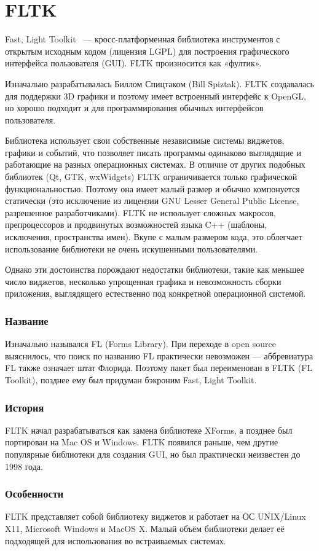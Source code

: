 \section{FLTK} %
Fast, Light Toolkit~\cite{wikiFL} — кросс-платформенная библиотека инструментов с открытым исходным кодом (лицензия LGPL) для построения графического интерфейса пользователя (GUI). FLTK произносится как «фултик».

Изначально разрабатывалась Биллом Спицтаком (Bill Spiztak). FLTK создавалась для поддержки 3D графики и поэтому имеет встроенный интерфейс к OpenGL, но хорошо подходит и для программирования обычных интерфейсов пользователя.

Библиотека использует свои собственные независимые системы виджетов, графики и событий, что позволяет писать программы одинаково выглядящие и работающие на разных операционных системах. В отличие от других подобных библиотек (Qt, GTK, wxWidgets) FLTK ограничивается только графической функциональностью. Поэтому она имеет малый размер и обычно компонуется статически (это исключение из лицензии GNU Lesser General Public License, разрешенное разработчиками). FLTK не использует сложных макросов, препроцессоров и продвинутых возможностей языка C++ (шаблоны, исключения, пространства имен). Вкупе с малым размером кода, это облегчает использование библиотеки не очень искушенными пользователями.

Однако эти достоинства порождают недостатки библиотеки, такие как меньшее число виджетов, несколько упрощенная графика и невозможность сборки приложения, выглядящего естественно под конкретной операционной системой.
\subsubsection{Название}
Изначально назывался FL (Forms Library). При переходе в open source выяснилось, что поиск по названию FL практически невозможен — аббревиатура FL также означает штат Флорида. Поэтому пакет был переименован в FLTK (FL Toolkit), позднее ему был придуман бэкроним Fast, Light Toolkit.
\subsubsection{История}
FLTK начал разрабатываться как замена библиотеке XForms, а позднее был портирован на Mac OS и Windows. FLTK появился раньше, чем другие популярные библиотеки для создания GUI, но был практически неизвестен до 1998 года.
\subsubsection{Особенности}
FLTK представляет собой библиотеку виджетов и работает на ОС UNIX/Linux X11, Microsoft Windows и MacOS X. Малый объём библиотеки делает её подходящей для использования во встраиваемых системах.

